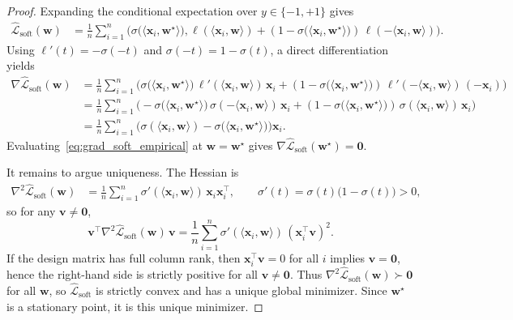 \documentclass{article}
\theoremstyle{plain}
\theoremstyle{definition}
\theoremstyle{remark}
\begin{document}
{\begin{proof}
Expanding the conditional expectation over $y\in\{-1,+1\}$ gives
\begin{align}
\widehat{\mathcal L}_{\mathrm{soft}}(\mathbf w)
&= \frac{1}{n}\sum_{i=1}^n
\Big(
\sigma\!\big(\langle \mathbf x_i,\mathbf w^\star\rangle\big),\ell(\langle \mathbf x_i,\mathbf w\rangle)
+ (1-\sigma\!\big(\langle \mathbf x_i,\mathbf w^\star\rangle\big))\,\ell(-\langle \mathbf x_i,\mathbf w\rangle)
\Big).
\end{align}
Using $\ell'(t)=-\sigma(-t)$ and $\sigma(-t)=1-\sigma(t)$, a direct differentiation yields
\begin{align}
\nabla \widehat{\mathcal L}_{\mathrm{soft}}(\mathbf w)
&= \frac{1}{n}\sum_{i=1}^n
\Big(
\sigma\!\big(\langle \mathbf x_i,\mathbf w^\star\rangle\big)\,\ell'(\langle \mathbf x_i,\mathbf w\rangle)\,\mathbf x_i
+ (1-\sigma\!\big(\langle \mathbf x_i,\mathbf w^\star\rangle\big))\,\ell'(-\langle \mathbf x_i,\mathbf w\rangle)\,(-\mathbf x_i)
\Big) \nonumber\\
&= \frac{1}{n}\sum_{i=1}^n
\Big(
- \sigma\!\big(\langle \mathbf x_i,\mathbf w^\star\rangle\big)\,\sigma(-\langle \mathbf x_i,\mathbf w\rangle)\,\mathbf x_i
+ (1-\sigma\!\big(\langle \mathbf x_i,\mathbf w^\star\rangle\big))\,\sigma(\langle \mathbf x_i,\mathbf w\rangle)\,\mathbf x_i
\Big) \nonumber\\
&= \frac{1}{n}\sum_{i=1}^n
\Big(
\sigma(\langle \mathbf x_i,\mathbf w\rangle) - \sigma\!\big(\langle \mathbf x_i,\mathbf w^\star\rangle\big)
\Big)\mathbf x_i.
\label{eq:grad_soft_empirical}
\end{align}
Evaluating~\eqref{eq:grad_soft_empirical} at $\mathbf w=\mathbf w^\star$ gives
$\nabla \widehat{\mathcal L}_{\mathrm{soft}}(\mathbf w^\star)=\mathbf 0$.

It remains to argue uniqueness. The Hessian is
\begin{align}
\nabla^2 \widehat{\mathcal L}_{\mathrm{soft}}(\mathbf w)
&= \frac{1}{n}\sum_{i=1}^n
\sigma'(\langle \mathbf x_i,\mathbf w\rangle)\,\mathbf x_i\mathbf x_i^\top,
\qquad
\sigma'(t)=\sigma(t)\big(1-\sigma(t)\big)>0,
\label{eq:hess_soft_empirical}
\end{align}
so for any $\mathbf v\neq \mathbf 0$,
\[
\mathbf v^\top \nabla^2 \widehat{\mathcal L}_{\mathrm{soft}}(\mathbf w)\,\mathbf v
= \frac{1}{n}\sum_{i=1}^n \sigma'(\langle \mathbf x_i,\mathbf w\rangle)\,(\mathbf x_i^\top \mathbf v)^2.
\]
If the design matrix has full column rank, then $\mathbf x_i^\top \mathbf v=0$
for all $i$ implies $\mathbf v=\mathbf 0$, hence the right-hand side is strictly
positive for all $\mathbf v\neq \mathbf 0$. Thus
$\nabla^2 \widehat{\mathcal L}_{\mathrm{soft}}(\mathbf w)\succ \mathbf 0$ for all
$\mathbf w$, so $\widehat{\mathcal L}_{\mathrm{soft}}$ is strictly convex and has a
unique global minimizer. Since $\mathbf w^\star$ is a stationary point, it is this
unique minimizer.


\end{proof}}
\end{document}
